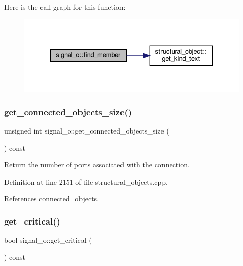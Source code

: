 Here is the call graph for this function\+:
\nopagebreak
\begin{figure}[H]
\begin{center}
\leavevmode
\includegraphics[width=326pt]{db/d5c/classsignal__o_aaab4b1d17a1ea687a8df19eef2a3eaf1_cgraph}
\end{center}
\end{figure}
\mbox{\label{classsignal__o_a7c10e814a8df1b8cbb19043fc8da4a0f}} 
\subsubsection{\texorpdfstring{get\+\_\+connected\+\_\+objects\+\_\+size()}{get\_connected\_objects\_size()}}
{\footnotesize\ttfamily unsigned int signal\+\_\+o\+::get\+\_\+connected\+\_\+objects\+\_\+size (\begin{DoxyParamCaption}{ }\end{DoxyParamCaption}) const}



Return the number of ports associated with the connection. 



Definition at line 2151 of file structural\+\_\+objects.\+cpp.



References connected\+\_\+objects.

\mbox{\label{classsignal__o_a2b78992ddcbbcdb36f30e44ac9c502aa}} 
\subsubsection{\texorpdfstring{get\+\_\+critical()}{get\_critical()}}
{\footnotesize\ttfamily bool signal\+\_\+o\+::get\+\_\+critical (\begin{DoxyParamCaption}{ }\end{DoxyParamCaption}) const}



